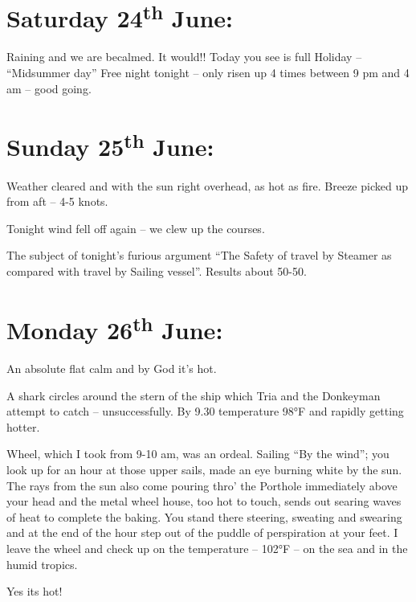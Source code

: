 \documentclass[
  11pt,
  msmallroyalvopaper
]{memoir}
\begin{document}
\hypertarget{saturday-24th-june}{%
\section{\texorpdfstring{Saturday 24\textsuperscript{th}
June:}{Saturday 24th June:}}\label{saturday-24th-june}}

Raining and we are becalmed. It would!! Today you see is full Holiday --
``Midsummer day'' Free night tonight -- only risen up 4 times between 9
pm and 4 am -- good going.

\hypertarget{sunday-25th-june}{%
\section{\texorpdfstring{Sunday 25\textsuperscript{th}
June:}{Sunday 25th June:}}\label{sunday-25th-june}}

Weather cleared and with the sun right overhead, as hot as fire. Breeze
picked up from aft -- 4-5 knots.

Tonight wind fell off again -- we clew up the courses.

The subject of tonight's furious argument ``The Safety of travel by
Steamer as compared with travel by Sailing vessel''. Results about
50-50.

\hypertarget{monday-26th-june}{%
\section{\texorpdfstring{Monday 26\textsuperscript{th}
June:}{Monday 26th June:}}\label{monday-26th-june}}

An absolute flat calm and by God it's hot.

A shark circles around the stern of the ship which Tria and the
Donkeyman attempt to catch -- unsuccessfully. By 9.30 temperature 98°F
and rapidly getting hotter.

Wheel, which I took from 9-10 am, was an ordeal. Sailing ``By the
wind''; you look up for an hour at those upper sails, made an eye
burning white by the sun. The rays from the sun also come pouring thro'
the Porthole immediately above your head and the metal wheel house, too
hot to touch, sends out searing waves of heat to complete the baking.
You stand there steering, sweating and swearing and at the end of the
hour step out of the puddle of perspiration at your feet. I leave the
wheel and check up on the temperature -- 102°F -- on the sea and in the
humid tropics.

Yes its hot!
\end{document}

